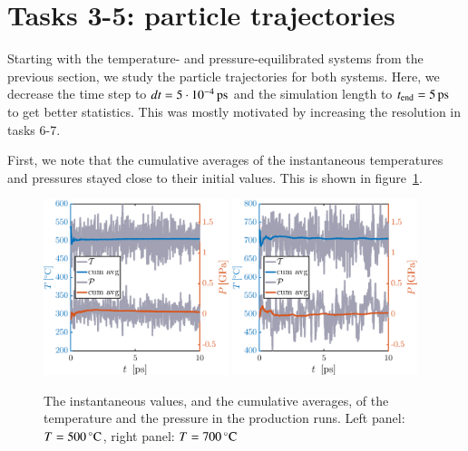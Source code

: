 \section*{Tasks 3-5: particle trajectories}
Starting with the temperature- and pressure-equilibrated systems from the previous section, we study the particle trajectories for both systems. Here, we decrease the time step to   $dt       = \unit[5\cdot 10^{-4}]{ps}$ and the simulation length to $t_{\rm end} = \unit[5]{ps}$ to get better statistics. This was mostly motivated by increasing the resolution in tasks 6-7. 

First, we note that the cumulative averages of the instantaneous temperatures and pressures stayed close to their initial values. This is shown in figure~\ref{fig:prod}.
\begin{figure}[!ht]
\begin{center}
  \includegraphics[width=0.48\textwidth]{../figures/TP-prod-500} 
    \includegraphics[width=0.48\textwidth]{../figures/TP-prod-700} 
  \caption{The instantaneous values, and the cumulative averages, of the temperature and the pressure in the production runs. Left panel: $T=\unit[500]{^\circ C}$,  right panel: $T=\unit[700]{^\circ C}$}
  \label{fig:prod}
\end{center}
\end{figure}

